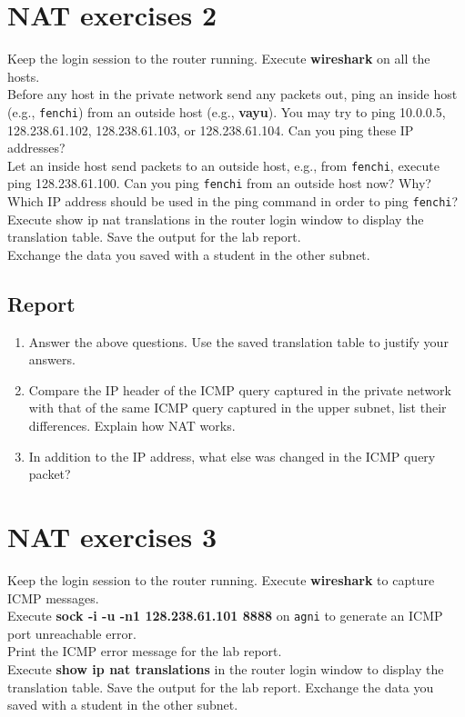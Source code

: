 \documentclass[10pt,a4paper]{article}
\numberwithin{equation}{section}
\numberwithin{figure}{section}
\numberwithin{table}{section}
\begin{document}
    \section*{NAT exercises 2}
    Keep the login session to the router running. Execute \textbf{wireshark} on all the hosts. \\
    Before any host in the private network send any packets out, ping an inside host (e.g., \texttt{fenchi}) from an outside host (e.g., \textbf{vayu}). You may try to ping 10.0.0.5, 128.238.61.102, 128.238.61.103, or 128.238.61.104. Can you ping these IP addresses? \\
    Let an inside host send packets to an outside host, e.g., from \texttt{fenchi}, execute ping 128.238.61.100. Can you ping \texttt{fenchi} from an outside host now? Why? Which IP address should be used in the ping command in order to ping \texttt{fenchi}? \\
    Execute show ip nat translations in the router login window to display the translation table. Save the output for the lab report. \\
    Exchange the data you saved with a student in the other subnet.
    \subsection*{Report}
    \begin{enumerate}
        \item Answer the above questions.
        Use the saved translation table to justify your answers.
        \item Compare the IP header of the ICMP query captured in the private network with that of the same ICMP query captured in the upper subnet, list their differences.
        Explain how NAT works.
        \item In addition to the IP address, what else was changed in the ICMP query packet?
    \end{enumerate}


    \section*{NAT exercises 3}
    Keep the login session to the router running. Execute \textbf{wireshark} to capture ICMP messages. \\
    Execute \textbf{sock -i -u -n1 128.238.61.101 8888} on \texttt{agni} to generate an ICMP port unreachable error. \\
    Print the ICMP error message for the lab report. \\
    Execute \textbf{show ip nat translations} in the router login window to display the translation table.
    Save the output for the lab report.
    Exchange the data you saved with a student in the other subnet.
\end{document}
